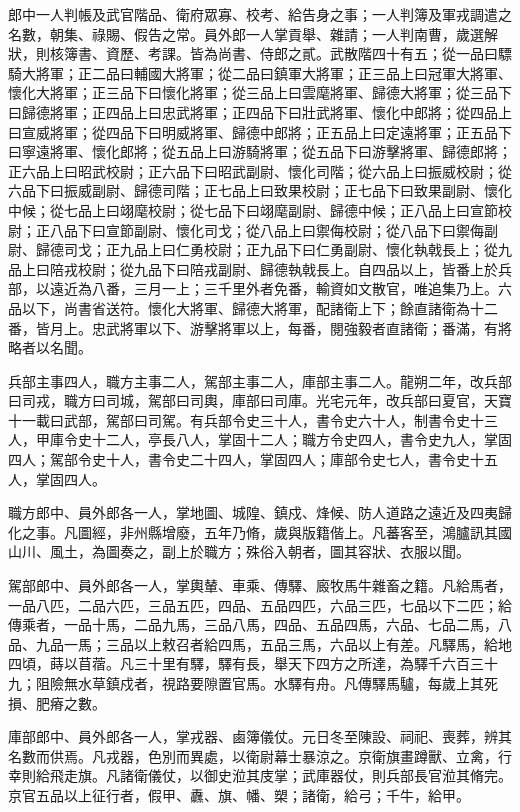 \begin{pinyinscope}
 郎中一人判帳及武官階品、衛府眾寡、校考、給告身之事；一人判簿及軍戎調遣之名數，朝集、祿賜、假告之常。員外郎一人掌貢舉、雜請；一人判南曹，歲選解狀，則核簿書、資歷、考課。皆為尚書、侍郎之貳。武散階四十有五；從一品曰驃騎大將軍；正二品曰輔國大將軍；從二品曰鎮軍大將軍；正三品上曰冠軍大將軍、懷化大將軍；正三品下曰懷化將軍；從三品上曰雲麾將軍、歸德大將軍；從三品下曰歸德將軍；正四品上曰忠武將軍；正四品下曰壯武將軍、懷化中郎將；從四品上曰宣威將軍；從四品下曰明威將軍、歸德中郎將；正五品上曰定遠將軍；正五品下曰寧遠將軍、懷化郎將；從五品上曰游騎將軍；從五品下曰游擊將軍、歸德郎將；正六品上曰昭武校尉；正六品下曰昭武副尉、懷化司階；從六品上曰振威校尉；從六品下曰振威副尉、歸德司階；正七品上曰致果校尉；正七品下曰致果副尉、懷化中候；從七品上曰翊麾校尉；從七品下曰翊麾副尉、歸德中候；正八品上曰宣節校尉；正八品下曰宣節副尉、懷化司戈；從八品上曰禦侮校尉；從八品下曰禦侮副尉、歸德司戈；正九品上曰仁勇校尉；正九品下曰仁勇副尉、懷化執戟長上；從九品上曰陪戎校尉；從九品下曰陪戎副尉、歸德執戟長上。自四品以上，皆番上於兵部，以遠近為八番，三月一上；三千里外者免番，輸資如文散官，唯追集乃上。六品以下，尚書省送符。懷化大將軍、歸德大將軍，配諸衛上下；餘直諸衛為十二番，皆月上。忠武將軍以下、游擊將軍以上，每番，閱強毅者直諸衛；番滿，有將略者以名聞。



 兵部主事四人，職方主事二人，駕部主事二人，庫部主事二人。龍朔二年，改兵部曰司戎，職方曰司城，駕部曰司輿，庫部曰司庫。光宅元年，改兵部曰夏官，天寶十一載曰武部，駕部曰司駕。有兵部令史三十人，書令史六十人，制書令史十三人，甲庫令史十二人，亭長八人，掌固十二人；職方令史四人，書令史九人，掌固四人；駕部令史十人，書令史二十四人，掌固四人；庫部令史七人，書令史十五人，掌固四人。



 職方郎中、員外郎各一人，掌地圖、城隍、鎮戍、烽候、防人道路之遠近及四夷歸化之事。凡圖經，非州縣增廢，五年乃脩，歲與版籍偕上。凡蕃客至，鴻臚訊其國山川、風土，為圖奏之，副上於職方；殊俗入朝者，圖其容狀、衣服以聞。



 駕部郎中、員外郎各一人，掌輿輦、車乘、傳驛、廄牧馬牛雜畜之籍。凡給馬者，一品八匹，二品六匹，三品五匹，四品、五品四匹，六品三匹，七品以下二匹；給傳乘者，一品十馬，二品九馬，三品八馬，四品、五品四馬，六品、七品二馬，八品、九品一馬；三品以上敕召者給四馬，五品三馬，六品以上有差。凡驛馬，給地四頃，蒔以苜蓿。凡三十里有驛，驛有長，舉天下四方之所達，為驛千六百三十九；阻險無水草鎮戍者，視路要隙置官馬。水驛有舟。凡傳驛馬驢，每歲上其死損、肥瘠之數。



 庫部郎中、員外郎各一人，掌戎器、鹵簿儀仗。元日冬至陳設、祠祀、喪葬，辨其名數而供焉。凡戎器，色別而異處，以衛尉幕士暴涼之。京衛旗畫蹲獸、立禽，行幸則給飛走旗。凡諸衛儀仗，以御史涖其庋掌；武庫器仗，則兵部長官涖其脩完。京官五品以上征行者，假甲、纛、旗、幡、槊；諸衛，給弓；千牛，給甲。




\end{pinyinscope}
